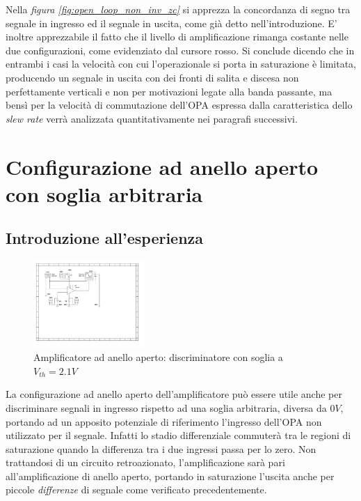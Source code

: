 \documentclass[journal]{IEEEtran}
\begin{document}
Nella \textit{figura \ref{fig:open_loop_non_inv_zc}} si apprezza la concordanza di segno tra segnale in ingresso ed il segnale in uscita, come già detto nell'introduzione. E' inoltre apprezzabile il fatto che il livello di amplificazione rimanga costante nelle due configurazioni, come evidenziato dal cursore rosso.
Si conclude dicendo che in entrambi i casi la velocità con cui l'operazionale si porta in saturazione è limitata, producendo un segnale in uscita con dei fronti di salita e discesa non perfettamente verticali e non per motivazioni legate alla banda passante, ma bensì per la velocità di commutazione dell'OPA espressa dalla caratteristica dello \textit{slew rate} verrà analizzata quantitativamente nei paragrafi successivi.  

\section{\textbf{Configurazione ad anello aperto con soglia arbitraria}} %

\subsection{\textbf{Introduzione all'esperienza}}
\begin{figure}[H]%
\begin {center}
\includegraphics[width=0.38\textwidth]{sch-simulations/output/OPA-biased.pdf}
\caption{Amplificatore ad anello aperto: discriminatore con soglia a $V_{th} = 2.1 V$}
\label{fig:circ_open_loop_biased}
\end {center}
\end{figure}

La configurazione ad anello aperto dell'amplificatore può essere utile anche per discriminare segnali in ingresso rispetto ad una soglia arbitraria, diversa da $0V$, portando ad un apposito potenziale di riferimento l'ingresso dell'OPA non utilizzato per il segnale. Infatti lo stadio differenziale commuterà tra le regioni di saturazione quando la differenza tra i due ingressi passa per lo zero.
Non trattandosi di un circuito retroazionato, l'amplificazione sarà pari all'amplificazione di anello aperto, portando in saturazione l'uscita anche per piccole \textit{differenze} di segnale come verificato precedentemente.
\end{document}

